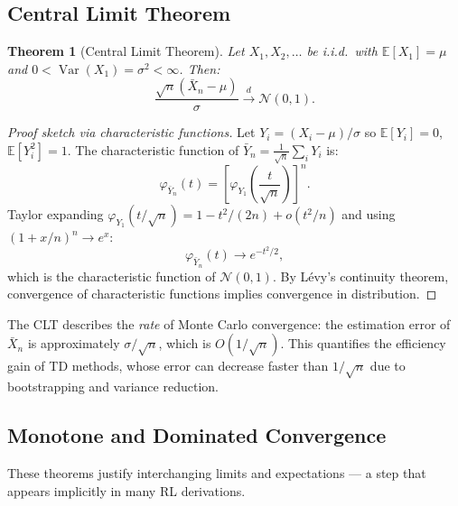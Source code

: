 \documentclass[11pt,a4paper]{article}
\theoremstyle{definition}
\theoremstyle{plain}
\newtheorem{theorem}{Theorem}[section]
\theoremstyle{remark}
\DeclareMathOperator{\Var}{Var}
\newcommand{\E}{\mathbb{E}}
\newcommand{\cdist}{\xrightarrow{d}}
\begin{document}
\subsection{Central Limit Theorem}
\label{subsec:clt}

\begin{theorem}[Central Limit Theorem]
\label{thm:clt}
Let $X_1, X_2, \ldots$ be i.i.d.\ with $\E[X_1] = \mu$ and $0 < \Var(X_1) = \sigma^2 < \infty$. Then:
\begin{equation}
    \frac{\sqrt{n}(\bar{X}_n - \mu)}{\sigma} \cdist \mathcal{N}(0, 1).
    \label{eq:clt}
\end{equation}
\end{theorem}

\begin{proof}[Proof sketch via characteristic functions]
Let $Y_i = (X_i - \mu)/\sigma$ so $\E[Y_i] = 0$, $\E[Y_i^2] = 1$. The characteristic function of $\bar{Y}_n = \frac{1}{\sqrt{n}}\sum_i Y_i$ is:
\begin{equation}
    \varphi_{\bar{Y}_n}(t) = \left[\varphi_{Y_1}\!\left(\frac{t}{\sqrt{n}}\right)\right]^n.
\end{equation}
Taylor expanding $\varphi_{Y_1}(t/\sqrt{n}) = 1 - t^2/(2n) + o(t^2/n)$ and using $(1 + x/n)^n \to e^x$:
\begin{equation}
    \varphi_{\bar{Y}_n}(t) \to e^{-t^2/2},
\end{equation}
which is the characteristic function of $\mathcal{N}(0,1)$. By L\'{e}vy's continuity theorem, convergence of characteristic functions implies convergence in distribution.
\end{proof}

\begin{rlconnection}[Connection to RL]
The CLT describes the \emph{rate} of Monte Carlo convergence: the estimation error of $\bar{X}_n$ is approximately $\sigma / \sqrt{n}$, which is $O(1/\sqrt{n})$. This quantifies the efficiency gain of TD methods, whose error can decrease faster than $1/\sqrt{n}$ due to bootstrapping and variance reduction.
\end{rlconnection}

\subsection{Monotone and Dominated Convergence}
\label{subsec:mct_dct}

These theorems justify interchanging limits and expectations --- a step that appears implicitly in many RL derivations.
\end{document}
